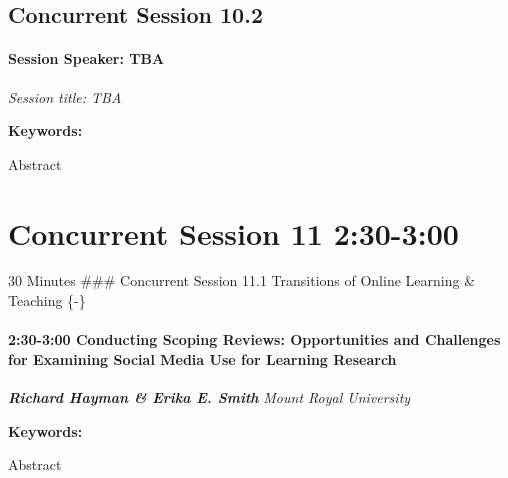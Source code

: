 \documentclass[
]{book}
\begin{document}
\hypertarget{concurrent-session-10.2}{%
\subsection*{Concurrent Session 10.2}\label{concurrent-session-10.2}}

\begin{speaker}
\hypertarget{session-speaker-tba}{%
\paragraph{\texorpdfstring{Session Speaker:
\textbf{TBA}}{Session Speaker: TBA}}\label{session-speaker-tba}}

\emph{Session title: TBA}

\textbf{Keywords:}

Abstract
\end{speaker}

\hypertarget{concurrent-session-11-230-300}{%
\section*{Concurrent Session 11 \textbar{} 2:30-3:00}\label{concurrent-session-11-230-300}}

30 Minutes
\#\#\# Concurrent Session 11.1 \textbar{} Transitions of Online Learning \& Teaching \{-\}

\begin{session}
\hypertarget{conducting-scoping-reviews-opportunities-and-challenges-for-examining-social-media-use-for-learning-research}{%
\paragraph*{\texorpdfstring{2:30-3:00 \textbar{} \textbf{Conducting
Scoping Reviews: Opportunities and Challenges for Examining Social Media
Use for Learning} \textbar{}
Research}{2:30-3:00 \textbar{} Conducting Scoping Reviews: Opportunities and Challenges for Examining Social Media Use for Learning \textbar{} Research}}\label{conducting-scoping-reviews-opportunities-and-challenges-for-examining-social-media-use-for-learning-research}}

\textbf{\emph{Richard Hayman \& Erika E. Smith}} \textbar{} \emph{Mount
Royal University}

\textbf{Keywords:}

Abstract
\end{session}
\end{document}
